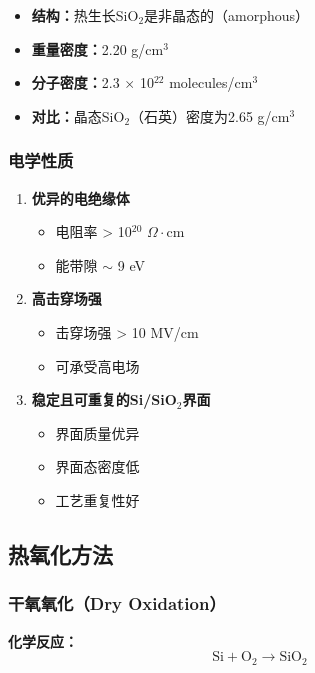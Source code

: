 \documentclass[UTF8,12pt,a4paper]{ctexart}
\begin{document}
\begin{itemize}
    \item \textbf{结构：}热生长SiO$_2$是非晶态的（amorphous）
    \item \textbf{重量密度：}2.20 g/cm$^3$
    \item \textbf{分子密度：}2.3 $\times$ 10$^{22}$ molecules/cm$^3$
    \item \textbf{对比：}晶态SiO$_2$（石英）密度为2.65 g/cm$^3$
\end{itemize}

\subsubsection{电学性质}

\begin{enumerate}
    \item \textbf{优异的电绝缘体}
    \begin{itemize}
        \item 电阻率 > 10$^{20}$ $\Omega \cdot$cm
        \item 能带隙 $\sim$ 9 eV
    \end{itemize}
    
    \item \textbf{高击穿场强}
    \begin{itemize}
        \item 击穿场强 > 10 MV/cm
        \item 可承受高电场
    \end{itemize}
    
    \item \textbf{稳定且可重复的Si/SiO$_2$界面}
    \begin{itemize}
        \item 界面质量优异
        \item 界面态密度低
        \item 工艺重复性好
    \end{itemize}
\end{enumerate}

\subsection{热氧化方法}

\subsubsection{干氧氧化（Dry Oxidation）}

\textbf{化学反应：}
\begin{equation}
\text{Si} + \text{O}_2 \rightarrow \text{SiO}_2
\end{equation}
\end{document}
